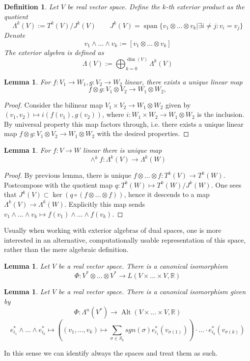 \documentclass{article}
\numberwithin{theorem}{section}
\newtheorem{lemma}[theorem]{Lemma}
\newtheorem{definition}[theorem]{Definition}
\newcommand{\R}{\mathbb{R}}
\newcommand{\1}{\mathds{1}}
\DeclareMathOperator{\Alt}{Alt}
\DeclareMathOperator{\vspan}{span}
\begin{document}
\begin{definition}
    Let $V$ be real vector space. Define the $k$-th exterior product as the quotient 
    \[ \Lambda^k(V) := T^k(V) / J^k(V) \qquad J^k(V) = \vspan{ \{ v_1 \otimes \dots \otimes v_k | \exists i \neq j : v_i = v_j \}  } \]
    Denote 
    \[ v_1 \wedge \dots \wedge v_k :=  [v_1 \otimes \dots \otimes v_k ]\]
    The exterior algebra is defined as  
    \[ \Lambda(V) := \bigoplus_{k=0}^{\dim(V)} \Lambda^k(V) \]
\end{definition}

\begin{lemma}
    For $f : V_1 \to W_1, g: V_2 \to W_2$ linear, there exists a unique linear map 
    \[ f \otimes g : V_1 \otimes V_2 \to W_1 \otimes W_2, \]
\end{lemma}
\begin{proof}
    Consider the bilinear map $V_1 \times V_2 \to W_1\otimes W_2$ given by $(v_1, v_2) \mapsto i(f(v_1), g(v_2)) $, where $i: W_1 \times W_2 \to W_1 \otimes W_2$ is the inclusion. By universal property this map factors through, i.e.  there exists a unique linear map $f\otimes g : V_1 \otimes V_2 \to W_1 \otimes W_2$ with the desired properties. 
\end{proof}

\begin{lemma}
    For $f: V \to W$ linear there is unique map 
    \[ \wedge^k f : \Lambda^k(V) \to \Lambda^k(W) \]
\end{lemma}
\begin{proof}
    By previous lemma, there is unique $f \otimes \dots \otimes f : T^k(V) \to T^k(W) $. Postcompose with the quotient map $q : T^k(W) \mapsto T^k(W) / J^k(W) $. One sees that $J^k(V) \subset \ker(q \circ (f\otimes \dots \otimes f) ) $, hence it descends to a map $\Lambda^k(V) \to \Lambda^k(W)$. Explicitly this map sends $v_1 \wedge \dots \wedge v_k \mapsto f(v_1) \wedge \dots \wedge f(v_k) $.  
\end{proof}
\noindent Usually when working with exterior algebras of dual spaces, one is more interested in an alternative, computationally usable representation of this space, rather than the mere algebraic definition. 
\begin{lemma}
    Let $V$ be a real vector space. There is a canonical isomorphism 
    \[ \Phi : V^* \otimes \dots \otimes V^* \to L(V\times \dots \times V, \R )\]
\end{lemma}
\begin{lemma}
    Let $V$ be a real vector space. There is a canonical isomorphism given by 
    \[ \Phi : \Lambda^n (V^*) \to \Alt(V\times \dots \times V , \R) \]
    \[ e^*_{i_1} \wedge \dots \wedge e^*_{i_k} \mapsto ( (v_1, \dots, v_k) \mapsto \sum_{\sigma \in S_k} sgn(\sigma) e^*_{i_1}(v_{\sigma(1)}))\cdot \dots \cdot e^*_{i_k}(v_{\sigma(k)}) \]
\end{lemma}
\noindent In this sense we can identify always the spaces and treat them as such.
\end{document}
